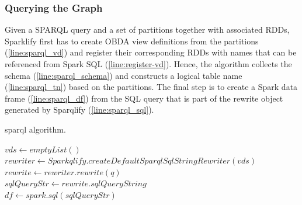 \subsubsection{Querying the Graph}
Given a SPARQL query and a set of partitions together with associated RDDs, Sparklify
first has to create OBDA view definitions from the partitions (\autoref{line:sparql_vd}) and register their corresponding RDDs with names that can be referenced from Spark SQL (\autoref{line:register-vd}). Hence, the algorithm collects the schema (\autoref{line:sparql_schema}) and constructs a logical table name (\autoref{line:sparql_tn}) based on the partitions.
The final step is to create a Spark data frame (\autoref{line:sparql_df}) from the SQL query that is part of the rewrite object generated by Sparqlify (\autoref{line:sparql_sql}).

\begin{algorithm}[t]
\caption{sparql algorithm.}
\label{alg:sparql}
    $vds \leftarrow emptyList()$\\
    $rewriter \leftarrow Sparkqlify.createDefaultSparqlSqlStringRewriter(vds)$ \label{line:sparql_rewriter}\\
    $rewrite \leftarrow rewriter.rewrite(q)$\\
$sqlQueryStr \leftarrow rewrite.sqlQueryString$ \label{line:sparql_sql}\\
  $df \leftarrow spark.sql(sqlQueryStr)$ \label{line:sparql_df}\\
         
\end{algorithm}

